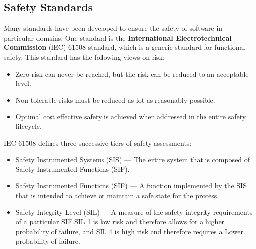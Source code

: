 \documentclass{article}
\begin{document}
\subsection{Safety Standards}
Many standards have been developed to ensure the safety of software in
particular domains. One standard is the \textbf{International
Electrotechnical Commission} (IEC) 61508 standard, which is a generic
standard for functional safety. This standard has the following views
on risk:
\begin{itemize}
    \item Zero risk can never be reached, but the risk can be reduced
          to an acceptable level.
    \item Non-tolerable risks must be reduced as lot as reasonably
          possible.
    \item Optimal cost effective safety is achieved when addressed in
          the entire safety lifecycle.
\end{itemize}
IEC 61508 defines three successive tiers of safety assessments:
\begin{itemize}
    \item Safety Instrumented Systems (SIS) --- The entire system that
          is composed of Safety Instrumented Functions (SIF).
    \item Safety Instrumented Functions (SIF) --- A function
          implemented by the SIS that is intended to achieve or
          maintain a safe state for the process.
    \item Safety Integrity Level (SIL) --- A measure of the safety
          integrity requirements of a particular SIF.\@ SIL 1 is low
          risk and therefore allows for a higher probability of
          failure, and SIL 4 is high risk and therefore requires a
          Lower probability of failure.
\end{itemize}
\end{document}
